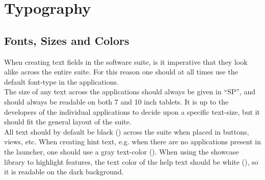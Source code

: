
\chapter{Typography}

\section{Fonts, Sizes and Colors}
When creating text fields in the \giraf software suite, is it imperative that they look alike across the entire suite. For this reason one should at all times use the default font-type in the applications. \\

\noindent The size of any text across the applications should always be given in ``SP'', and should always be readable on both 7 and 10 inch tablets. It is up to the developers of the individual applications to decide upon a specific text-size, but it should fit the general layout of the suite. \\

\noindent All text should by default be black () across the suite when placed in buttons, views, etc. When creating hint text, e.g. when there are no applications present in the launcher, one should use a gray text-color (). When using the showcase library to highlight features, the text color of the help text should be white (), so it is readable on the dark background. 

